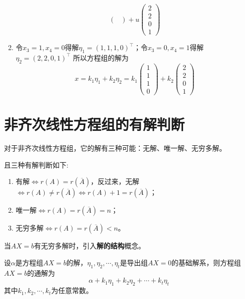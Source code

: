\begin{solution}
\begin{enumerate}[itemindent=1em,label=\textbf{\textsf{方法}}\arabic*]
\[\begin{pmatrix}
                  \end{pmatrix}
                  + u
                  \begin{pmatrix}
                      2 \\2\\0\\1
                  \end{pmatrix}
              \]
        \item 令$x_3=1,x_4=0$得解$\eta_1 = (1,1,1,0)^\intercal$；令$x_3=0,x_4=1$得解$\eta_2=(2,2,0,1)^\intercal$
              所以方程组的解为
              \[
                  x= k_1\eta_1+k_2\eta_2 =
                  k_1
                  \begin{pmatrix}
                      1 \\1\\1\\0
                  \end{pmatrix}
                  +
                  k_2
                  \begin{pmatrix}
                      2 \\2\\0\\1
                  \end{pmatrix}
              \]
    \end{enumerate}
\end{solution}

\section{非齐次线性方程组的有解判断}
对于非齐次线性方程组，它的解有三种可能：无解、唯一解、无穷多解。
\begin{theorem}
    且三种有解判断如下:
    \begin{enumerate}[(1)]
        \item 有解$\iff r(A)=r(\overline{A})$，反过来，无解$\iff r(A)\neq r(\overline{A}) \iff r(A)+1 = r(\overline{A})$；
        \item 唯一解$\iff r(A)=r(\overline{A}) = n$；
        \item 无穷多解$\iff r(A)=r(\overline{A})<n$。
    \end{enumerate}
\end{theorem}

当$AX=b$有无穷多解时，引入\textbf{\textsf{解的结构}}概念。
\begin{theorem}
    设$\alpha$是方程组$AX=b$的解，$\eta_1,\eta_2,\cdots,\eta_t$是导出组$AX=0$的基础解系，则方程组$AX=b$的通解为
    \[ \alpha + k_1\eta_1 + k_2\eta_2 + \cdots + k_t\eta_t \]
    其中$k_1,k_2,\cdots,k_t$为任意常数。
\end{theorem}


